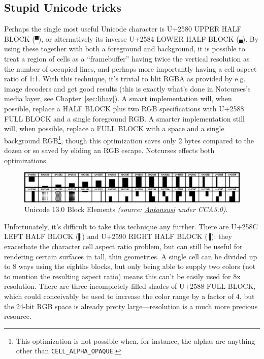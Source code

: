 \documentclass[letterpaper,10pt]{article}
\begin{document}
\subsection{Stupid Unicode tricks}
Perhaps the single most useful Unicode character is U+2580 UPPER HALF BLOCK
(\texttt{▀}), or alternatively its inverse U+2584 LOWER HALF BLOCK
(\texttt{▄}). By using these together with both a foreground and background,
it is possible to treat a region of cells as a ``framebuffer'' having twice the
vertical resolution as the number of occupied lines, and perhaps more importantly
having a cell aspect ratio of 1:1. With this technique, it's trivial to blit
RGBA as provided by e.g. image decoders and get good results (this is exactly
what's done in Notcurses's media layer, see Chapter~\ref{sec:libav}). A smart
implementation will, when possible, replace a HALF BLOCK plus two RGB specifications
with U+2588 FULL BLOCK and a single foreground RGB. A smarter implementation
still will, when possible, replace a FULL BLOCK with a space and a single
background RGB\footnote{This optimization is not possible when, for instance,
the alphas are anything other than \texttt{CELL\_ALPHA\_OPAQUE}.}, though this
optimization saves only 2 bytes compared to the dozen or so saved by eliding
an RGB escape. Notcurses effects both optimizations.

\begin{figure}[!htb]
    \centering
    \includegraphics[width=.75\linewidth]{media/blockelements.png}
    \caption{Unicode 13.0 Block Elements \textit{(source: \href{https://commons.wikimedia.org/wiki/File:UCB_Block_Elements.png}{Antonsusi} under CCA3.0)}.}
\end{figure}

Unfortunately, it's difficult to take this technique any further. There are
U+258C LEFT HALF BLOCK (\texttt{▌}) and U+2590 RIGHT HALF BLOCK (\texttt{▐}):
they exacerbate the character cell aspect ratio problem, but can still be
useful for rendering certain surfaces in tall, thin geometries. A single cell
can be divided up to 8 ways using the eighths blocks, but only being able to
supply two colors (not to mention the resulting aspect ratio) means this can't
be easily used for 8x resolution. There are three incompletely-filled shades of
U+2588 FULL BLOCK, which could conceivably be used to increase the color range
by a factor of 4, but the 24-bit RGB space is already pretty large---resolution
is a much more precious resource.
\end{document}
